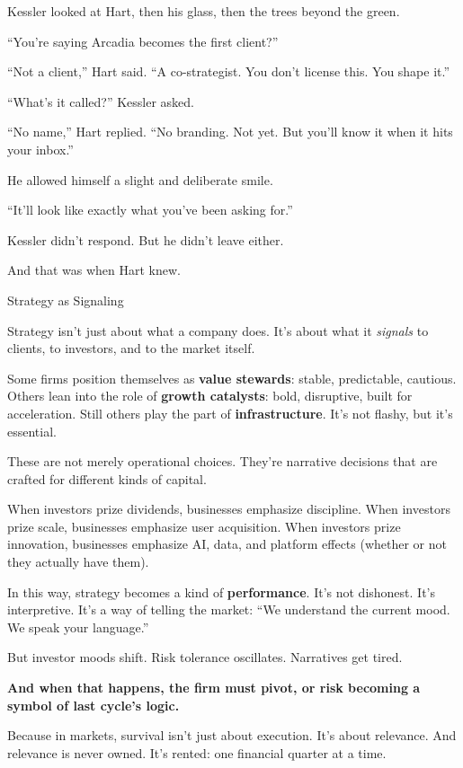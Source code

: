 Kessler looked at Hart, then his glass, then the trees beyond the green. 

“You’re saying Arcadia becomes the first client?”

“Not a client,” Hart said. “A co-strategist. You don’t license this. You shape it.”

“What’s it called?” Kessler asked.

“No name,” Hart replied. “No branding. Not yet. But you’ll know it when it hits your inbox.”

He allowed himself a slight and deliberate smile.

“It’ll look like exactly what you’ve been asking for.”

Kessler didn’t respond. But he didn’t leave either.

And that was when Hart knew.

\medskip

\begin{PhilosophicalSidebar}{Strategy as Signaling}

  Strategy isn’t just about what a company does.  
  It’s about what it \textit{signals} to clients, to investors, and to the market itself.
  
  \medskip
  
  Some firms position themselves as \textbf{value stewards}: stable, predictable, cautious.  
  Others lean into the role of \textbf{growth catalysts}: bold, disruptive, built for acceleration.  
  Still others play the part of \textbf{infrastructure}. It's not flashy, but it's essential.
  
  \medskip
  
  These are not merely operational choices.  
  They’re narrative decisions that are crafted for different kinds of capital.
  
  \medskip
  
  When investors prize dividends, businesses emphasize discipline.  
  When investors prize scale, businesses emphasize user acquisition.  
  When investors prize innovation, businesses emphasize AI, data, and platform effects
  (whether or not they actually have them).
  
  \medskip
  
  In this way, strategy becomes a kind of \textbf{performance}.  
  It's not dishonest. It's interpretive.  
  It's a way of telling the market: ``We understand the current mood. We speak your language.''
  
  \medskip
  
  But investor moods shift.  
  Risk tolerance oscillates.  
  Narratives get tired.

  \medskip
  
  \textbf{And when that happens, the firm must pivot, or risk becoming a symbol of last cycle’s logic.}
  
  \medskip
  
  Because in markets, survival isn’t just about execution.  
  It’s about relevance.  
  And relevance is never owned.  
  It’s rented: one financial quarter at a time.
  
\end{PhilosophicalSidebar}

